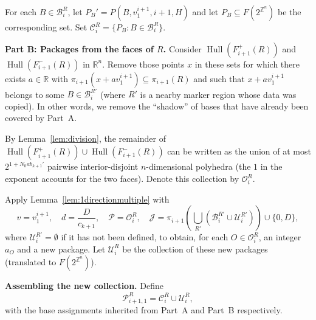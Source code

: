 \documentclass[10pt,a4paper]{amsart}
\DeclareMathOperator{\Hull}{Hull}
\begin{document}
For each $B\in\mathcal{B}_i^R$, let
$P_B'=P(B, v_1^{i+1}, i+1, H)$ and let $P_B\subseteq F(2^{\mathbb{Z}^n})$
be the corresponding set. Set
$\mathcal{C}_{i}^R=\{P_B\colon B\in\mathcal{B}_i^R\}$.

\medskip\noindent
\textbf{Part B: Packages from the faces of $R$.}
Consider $\Hull(F_{i+1}^+(R))$ and $\Hull(F_{i+1}^-(R))$ in
$\mathbb{R}^n$. Remove those points $x$ in these sets for which there
exists $a\in\mathbb{R}$ with
$\pi_{i+1}(x+av_1^{i+1})\subseteq\pi_{i+1}(R)$ and such that
$x+av_1^{i+1}$ belongs to some $B\in\mathcal{B}_i^{R'}$ (where $R'$ is a
nearby marker region whose data was copied). In other words, we remove
the ``shadow'' of bases that have already been covered by Part~A.

By Lemma~\ref{lem:division}, the remainder of
$\Hull(F_{i+1}^+(R))\cup\Hull(F_{i+1}^-(R))$ can be written as the
union of at most $2^{1+N_0a b_{k+1}'}$ pairwise interior-disjoint
$n$-dimensional polyhedra (the $1$ in the exponent accounts for the
two faces). Denote this collection by $\mathcal{O}_i^R$.

Apply Lemma~\ref{lem:1directionmultiple} with
\[
v=v_1^{i+1},\quad d=\frac{D}{c_{k+1}},\quad
\mathcal{P}=\mathcal{O}_i^R,\quad
\mathcal{J}=\pi_{i+1}\left (\bigcup_{R'}(\mathcal{B}_i^{R'}\cup \mathcal{U}_i^{R'})\right )
\cup\{0, D\},
\]
where $\mathcal{U}_i^{R'}=\emptyset$ if it has not been defined, 
to obtain, for each $O\in\mathcal{O}_i^R$, an integer $a_O$ and a new
package. Let $\mathcal{U}_i^R$ be the collection of these new packages
(translated to $F(2^{\mathbb{Z}^n})$).

\medskip\noindent
\textbf{Assembling the new collection.}
Define
\[
\mathcal{P}_{i+1,1}^R=\mathcal{C}_i^R\cup\mathcal{U}_i^R,
\]
with the base assignments inherited from Part~A and Part~B respectively.
\end{document}
